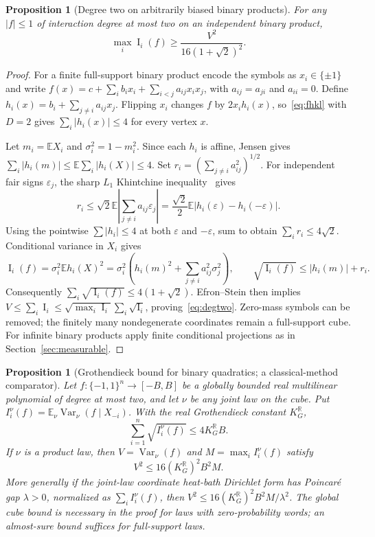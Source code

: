 \documentclass[11pt]{article}
\numberwithin{equation}{section}
\newtheorem{proposition}[theorem]{Proposition}
\theoremstyle{remark}
\newcommand{\E}{\mathbb E}
\newcommand{\Var}{\operatorname{Var}}
\newcommand{\Inf}{\operatorname{I}}
\begin{document}
\begin{proposition}[Degree two on arbitrarily biased binary products]\label{prop:degtwo}
For any $|f|\le1$ of interaction degree at most two on an independent binary product,
\begin{equation}\label{eq:degtwo}
 \max_i\Inf_i(f)\ge\frac{V^2}{16(1+\sqrt2)^2}.
\end{equation}
\end{proposition}
\begin{proof}
For a finite full-support binary product encode the symbols as $x_i\in\{\pm1\}$ and write
$ f(x)=c+\sum_ib_ix_i+\sum_{i<j}a_{ij}x_ix_j$, with $a_{ij}=a_{ji}$ and $a_{ii}=0$. Define
$h_i(x)=b_i+\sum_{j\ne i}a_{ij}x_j$. Flipping $x_i$ changes $f$ by $2x_ih_i(x)$, so~\eqref{eq:fhkl} with $D=2$ gives $\sum_i|h_i(x)|\le4$ for every vertex $x$.

Let $m_i=\E X_i$ and $\sigma_i^2=1-m_i^2$. Since each $h_i$ is affine, Jensen gives
$\sum_i|h_i(m)|\le\E\sum_i|h_i(X)|\le4$. Set
$r_i=(\sum_{j\ne i}a_{ij}^2)^{1/2}$. For independent fair signs $\varepsilon_j$, the sharp $L_1$ Khintchine inequality~\cite[Sect.~1]{Sza76} gives
\[
 r_i\le\sqrt2\E\left|\sum_{j\ne i}a_{ij}\varepsilon_j\right|
 =\frac{\sqrt2}{2}\E|h_i(\varepsilon)-h_i(-\varepsilon)|.
\]
Using the pointwise $\sum|h_i|\le4$ at both $\varepsilon$ and $-\varepsilon$, sum to obtain $\sum_ir_i\le4\sqrt2$. Conditional variance in $X_i$ gives
\[
 \Inf_i(f)=\sigma_i^2\E h_i(X)^2
 =\sigma_i^2\left(h_i(m)^2+\sum_{j\ne i}a_{ij}^2\sigma_j^2\right),
 \qquad \sqrt{\Inf_i(f)}\le|h_i(m)|+r_i.
\]
Consequently $\sum_i\sqrt{\Inf_i(f)}\le4(1+\sqrt2)$. Efron--Stein then implies
$V\le\sum_i\Inf_i\le\sqrt{\max_i\Inf_i}\sum_i\sqrt{\Inf_i}$, proving~\eqref{eq:degtwo}. Zero-mass symbols can be removed; the finitely many nondegenerate coordinates remain a full-support cube. For infinite binary products apply finite conditional projections as in Section~\ref{sec:measurable}.
\end{proof}
\begin{proposition}[Grothendieck bound for binary quadratics; a classical-method comparator]\label{prop:groth}
Let $f:\{-1,1\}^n\to[-B,B]$ be a globally bounded real multilinear polynomial of degree at most two, and let $\nu$ be \emph{any joint law} on the cube. Put $I_i^\nu(f)=\mathbb E_\nu\Var_\nu(f\mid X_{-i})$. With the real Grothendieck constant $K_G^{\mathbb R}$,
\begin{equation}\label{eq:groth-root}
 \sum_{i=1}^n\sqrt{I_i^\nu(f)}\le4K_G^{\mathbb R} B.
\end{equation}
If $\nu$ is a product law, then $V=\Var_\nu(f)$ and $M=\max_i I_i^\nu(f)$ satisfy
\begin{equation}\label{eq:groth-quad}
 V^2\le16(K_G^{\mathbb R})^2 B^2 M.
\end{equation}
More generally if the joint-law coordinate heat-bath Dirichlet form has Poincar\'e gap $\lambda>0$, normalized as $\sum_i I_i^\nu(f)$, then $V^2\le16(K_G^{\mathbb R})^2B^2M/\lambda^2$. The global cube bound is necessary in the proof for laws with zero-probability words; an almost-sure bound suffices for full-support laws.
\end{proposition}
\end{document}
